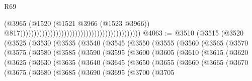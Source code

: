 \begin{lexlean}{R69}
\begin{coremodule}
{                                                                                        (@3965
                                                                                          (@1520
                                                                                            (@1521
                                                                                              @3966
                                                                                              (@1523
                                                                                                @3966))
                                                                                            @817))))))))))))))))))))))))))))))))))))))))))))
@4063 := @3510
    (@3515
      (@3520
        (@3525
          (@3530
            (@3535
              (@3540
                (@3545
                  (@3550
                    (@3555
                      (@3560
                        (@3565
                          (@3570
                            (@3575
                              (@3580
                                (@3585
                                  (@3590
                                    (@3595
                                      (@3600
                                        (@3605
                                          (@3610
                                            (@3615
                                              (@3620
                                                (@3625
                                                  (@3630
                                                    (@3635
                                                      (@3640
                                                        (@3645
                                                          (@3650
                                                            (@3655
                                                              (@3660
                                                                (@3665
                                                                  (@3670
                                                                    (@3675
                                                                      (@3680
                                                                        (@3685
                                                                          (@3690
                                                                            (@3695
                                                                              (@3700
                                                                                (@3705
}
\end{coremodule}
\end{lexlean}
